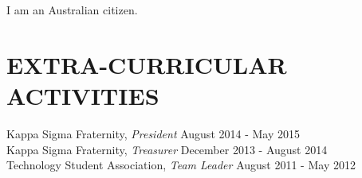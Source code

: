 \documentclass[margin, 10pt]{res} %
\begin{document}
\begin{resume}
I am an Australian citizen.


\section{EXTRA-CURRICULAR \\ ACTIVITIES} 

Kappa Sigma Fraternity, {\sl President} \hfill August 2014 - May 2015\\
Kappa Sigma Fraternity, {\sl Treasurer} \hfill December 2013 - August 2014 \\
Technology Student Association, {\sl Team Leader} \hfill August 2011 - May 2012 \\
 


\end{resume}
\end{document}
